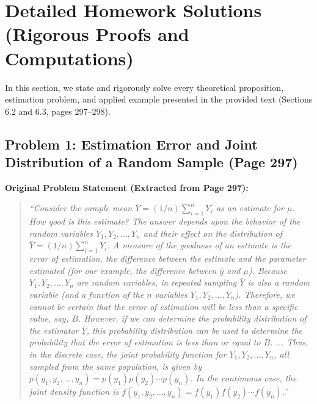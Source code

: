\documentclass[11pt, letterpaper]{article}
\theoremstyle{definition}
\theoremstyle{remark}
\begin{document}
\section{Detailed Homework Solutions (Rigorous Proofs and Computations)}

In this section, we state and rigorously solve every theoretical proposition, estimation problem, and applied example presented in the provided text (Sections 6.2 and 6.3, pages 297--298).

\subsection{Problem 1: Estimation Error and Joint Distribution of a Random Sample (Page 297)}

\textbf{Original Problem Statement (Extracted from Page 297):}
\begin{quote}
\textit{``Consider the sample mean $\bar{Y} = (1/n)\sum_{i=1}^n Y_i$ as an estimate for $\mu$. How good is this estimate? The answer depends upon the behavior of the random variables $Y_1, Y_2, \dots, Y_n$ and their effect on the distribution of $\bar{Y} = (1/n)\sum_{i=1}^n Y_i$. A measure of the goodness of an estimate is the error of estimation, the difference between the estimate and the parameter estimated (for our example, the difference between $\bar{y}$ and $\mu$). Because $Y_1, Y_2, \dots, Y_n$ are random variables, in repeated sampling $\bar{Y}$ is also a random variable (and a function of the $n$ variables $Y_1, Y_2, \dots, Y_n$). Therefore, we cannot be certain that the error of estimation will be less than a specific value, say, $B$. However, if we can determine the probability distribution of the estimator $\bar{Y}$, this probability distribution can be used to determine the probability that the error of estimation is less than or equal to $B$. ... Thus, in the discrete case, the joint probability function for $Y_1, Y_2, \dots, Y_n$, all sampled from the same population, is given by $p(y_1, y_2, \dots, y_n) = p(y_1)p(y_2)\cdots p(y_n)$. In the continuous case, the joint density function is $f(y_1, y_2, \dots, y_n) = f(y_1)f(y_2)\cdots f(y_n)$.''}
\end{quote}
\end{document}
